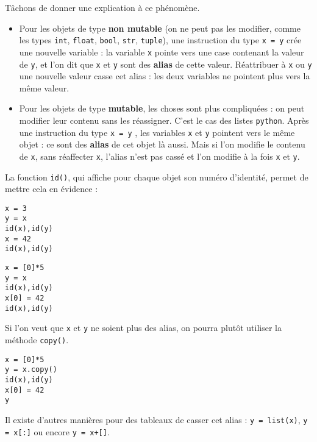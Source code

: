 Tâchons de donner une explication à ce phénomène.
\begin{itemize}
  \item Pour les objets de type \textbf{non mutable} (on ne peut pas les modifier, comme les types 
  \texttt{int}, \texttt{float}, \texttt{bool}, \texttt{str}, \texttt{tuple}), une instruction du type \texttt{x = y} 
crée une nouvelle variable : la variable \texttt{x} pointe vers une case contenant la valeur de 
\texttt{y}, et l'on dit que \texttt{x} et \texttt{y} sont des \textbf{alias} de cette valeur. Réattribuer à 
\texttt{x} ou \texttt{y} une nouvelle valeur casse cet alias : les deux variables ne pointent plus vers la 
même valeur.
  \item Pour les objets de type \textbf{mutable}, les choses sont plus compliquées : on peut modifier 
leur contenu sans les réassigner. C'est le cas des listes \texttt{python}. Après une instruction du type 
\texttt{x = y} , les variables \texttt{x} et \texttt{y} pointent vers le même objet : ce sont des 
\textbf{alias} de cet objet là aussi. Mais si l'on modifie le contenu de \texttt{x}, sans réaffecter 
\texttt{x}, l'alias n'est pas cassé et l'on modifie à la fois \texttt{x} et \texttt{y}.
\end{itemize}



La fonction \texttt{id()}, qui affiche pour chaque objet son \og numéro d'identité\fg, permet de 
mettre cela en évidence :
\begin{multicols}{2}
\begin{lstlisting}
x = 3
y = x
id(x),id(y)
x = 42
id(x),id(y)
\end{lstlisting}


\begin{lstlisting}
x = [0]*5
y = x
id(x),id(y)
x[0] = 42
id(x),id(y)
\end{lstlisting}

\end{multicols}
Si l'on veut que \texttt{x} et \texttt{y} ne soient plus des alias, on pourra plutôt utiliser la méthode 
\texttt{copy()}.

\begin{lstlisting}
x = [0]*5
y = x.copy()
id(x),id(y)
x[0] = 42
y
\end{lstlisting}

Il existe d'autres manières pour des tableaux de casser cet alias : \texttt{y = list(x)}, \texttt{y = 
x[:]} ou encore \texttt{y = x+[]}.

